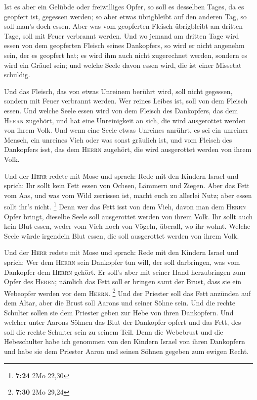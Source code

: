  Ist es aber ein Gelübde oder freiwilliges Opfer, so soll
es desselben Tages, da es geopfert ist, gegessen werden; so aber etwas
übrigbleibt auf den anderen Tag, so soll man's doch essen.
 Aber was vom geopferten Fleisch übrigbleibt am dritten
Tage, soll mit Feuer verbrannt werden.  Und wo jemand am
dritten Tage wird essen von dem geopferten Fleisch seines Dankopfers, so
wird er nicht angenehm sein, der es geopfert hat; es wird ihm auch nicht
zugerechnet werden, sondern es wird ein Gräuel sein; und welche Seele
davon essen wird, die ist einer Missetat schuldig.

 Und das Fleisch, das von etwas Unreinem berührt wird,
soll nicht gegessen, sondern mit Feuer verbrannt werden. Wer reines
Leibes ist, soll von dem Fleisch essen.  Und welche Seele
essen wird von dem Fleisch des Dankopfers, das dem \textsc{Herrn}
zugehört, und hat eine Unreinigkeit an sich, die wird ausgerottet werden
von ihrem Volk.  Und wenn eine Seele etwas Unreines
anrührt, es sei ein unreiner Mensch, ein unreines Vieh oder was sonst
gräulich ist, und vom Fleisch des Dankopfers isst, das dem
\textsc{Herrn} zugehört, die wird ausgerottet werden von ihrem Volk.

 Und der \textsc{Herr} redete mit Mose und sprach:
 Rede mit den Kindern Israel und sprich: Ihr sollt kein
Fett essen von Ochsen, Lämmern und Ziegen.  Aber das Fett
vom Aas, und was vom Wild zerrissen ist, macht euch zu allerlei Nutz;
aber essen sollt ihr's nicht. \footnote{\textbf{7:24} 2Mo 22,30}
 Denn wer das Fett isst von dem Vieh, davon man dem
\textsc{Herrn} Opfer bringt, dieselbe Seele soll ausgerottet werden von
ihrem Volk.  Ihr sollt auch kein Blut essen, weder vom
Vieh noch von Vögeln, überall, wo ihr wohnt.  Welche
Seele würde irgendein Blut essen, die soll ausgerottet werden von ihrem
Volk.

 Und der \textsc{Herr} redete mit Mose und sprach:
 Rede mit den Kindern Israel und sprich: Wer dem
\textsc{Herrn} sein Dankopfer tun will, der soll darbringen, was vom
Dankopfer dem \textsc{Herrn} gehört.  Er soll's aber mit
seiner Hand herzubringen zum Opfer des \textsc{Herrn}; nämlich das Fett
soll er bringen samt der Brust, dass sie ein Webeopfer werden vor dem
\textsc{Herrn}. \footnote{\textbf{7:30} 2Mo 29,24}  Und
der Priester soll das Fett anzünden auf dem Altar, aber die Brust soll
Aarons und seiner Söhne sein.  Und die rechte Schulter
sollen sie dem Priester geben zur Hebe von ihren Dankopfern.
 Und welcher unter Aarons Söhnen das Blut der Dankopfer
opfert und das Fett, des soll die rechte Schulter sein zu seinem Teil.
 Denn die Webebrust und die Hebeschulter habe ich
genommen von den Kindern Israel von ihren Dankopfern und habe sie dem
Priester Aaron und seinen Söhnen gegeben zum ewigen Recht.

